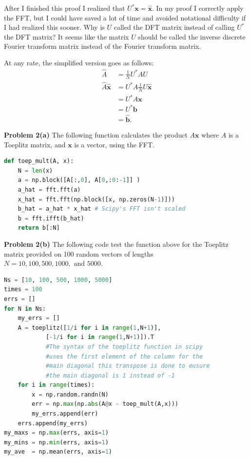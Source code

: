 \documentclass[12pt]{article}
\newcommand{\problem}[1]{\hspace{-4 ex} \large \textbf{Problem #1} }
\renewcommand{\vec}[1]{\boldsymbol{\mathbf{#1}}}
\begin{document}
After I finished this proof I realized that $U^*\vec{x} = \hat{\vec{x}}$. In my proof I correctly apply the FFT, but I could have saved a lot of time and avoided notational difficulty if I had realized this sooner. Why is $U$ called the DFT matrix instead of calling $U^*$ the DFT matrix? It seems like the matrix $U$ should be called the inverse discrete Fourier transform matrix instead of the Fourier transform matrix.
\bigbreak

At any rate, the simplified version goes as follows:
\begin{align*}
	\hat{A} &= \frac{1}{N}U^* A U \\
	\hat{A}\hat{\vec{x}} &= U^* A \frac{1}{N}U \hat{\vec{x}} \\
	&= U^* A \vec{x} \\
	&= U^* \vec{b} \\
	&= \hat{\vec{b}} \text{.}
\end{align*}

\bigbreak
\problem{2(a)} The following function calculates the product $A\vec{x}$ where $A$ is a Toeplitz matrix, and $\vec{x}$ is a vector, using the FFT.
\begin{lstlisting}[language=Python]
def toep_mult(A, x):
	N = len(x)
	a = np.block([A[:,0], A[0,:0:-1]] )
	a_hat = fft.fft(a)
	x_hat = fft.fft(np.block([x, np.zeros(N-1)]))
	b_hat = a_hat * x_hat # Scipy's FFT isn't scaled
	b = fft.ifft(b_hat)
	return b[:N]
\end{lstlisting}



\problem{2(b)} The following code test the function above for the Toeplitz matrix provided on 100 random vectors of lengths $N= 10, 100, 500, 1000, \text{ and }5000$. 
\begin{lstlisting}[language=Python]
Ns = [10, 100, 500, 1000, 5000]
times = 100
errs = []
for N in Ns:
	my_errs = []
	A = toeplitz([1/i for i in range(1,N+1)], 
			[-1/i for i in range(1,N+1)]).T
			#The syntax of the toeplitz function in scipy
			#uses the first element of the column for the
			#main diagonal this transpose is done to eusure 
			#the main diagonal is 1 instead of -1
	for i in range(times):
		x = np.random.randn(N)
		err = np.max(np.abs(A@x - toep_mult(A,x)))
		my_errs.append(err)
	errs.append(my_errs)
my_maxs = np.max(errs, axis=1)
my_mins = np.min(errs, axis=1)
my_ave  = np.mean(errs, axis=1)
\end{lstlisting}
\end{document}
